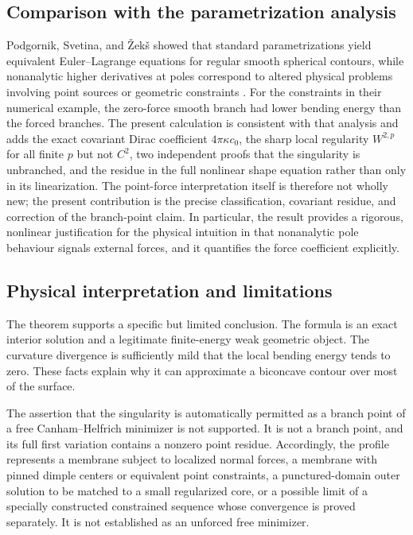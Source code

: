 \documentclass[preprint,amsmath,amssymb,aps,prl,superscriptaddress,nofootinbib,floatfix]{revtex4-2}
\begin{document}
\subsection{Comparison with the parametrization analysis}\label{sec:1995}
Podgornik, Svetina, and \v{Z}ek\v{s} showed that standard parametrizations yield equivalent Euler--Lagrange equations for regular smooth spherical contours, while nonanalytic higher derivatives at poles correspond to altered physical problems involving point sources or geometric constraints \cite{Podgornik1995}. For the constraints in their numerical example, the zero-force smooth branch had lower bending energy than the forced branches. The present calculation is consistent with that analysis and adds the exact covariant Dirac coefficient \(4\pi\kappa c_0\), the sharp local regularity \(W^{2,p}\) for all finite \(p\) but not \(C^2\), two independent proofs that the singularity is unbranched, and the residue in the full nonlinear shape equation rather than only in its linearization. The point-force interpretation itself is therefore not wholly new; the present contribution is the precise classification, covariant residue, and correction of the branch-point claim. In particular, the result provides a rigorous, nonlinear justification for the physical intuition in \cite{Podgornik1995} that nonanalytic pole behaviour signals external forces, and it quantifies the force coefficient explicitly.

\subsection{Physical interpretation and limitations}\label{sec:physical}
The theorem supports a specific but limited conclusion. The formula is an exact interior solution and a legitimate finite-energy weak geometric object. The curvature divergence is sufficiently mild that the local bending energy tends to zero. These facts explain why it can approximate a biconcave contour over most of the surface.

The assertion that the singularity is automatically permitted as a branch point of a free Canham--Helfrich minimizer is not supported. It is not a branch point, and its full first variation contains a nonzero point residue. Accordingly, the profile represents a membrane subject to localized normal forces, a membrane with pinned dimple centers or equivalent point constraints, a punctured-domain outer solution to be matched to a small regularized core, or a possible limit of a specially constructed constrained sequence whose convergence is proved separately. It is not established as an unforced free minimizer.
\end{document}
